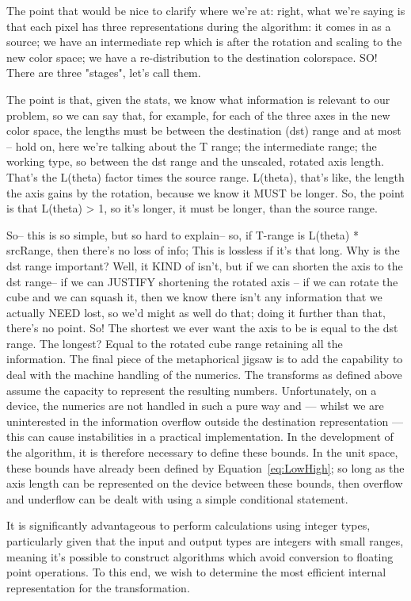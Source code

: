 The point that would be nice to clarify where we're at: right, what we're saying is that each pixel has three representations during the algorithm: it comes in as a source; we have an intermediate rep which is after the rotation and scaling to the new color space; we have a re-distribution to the destination colorspace. SO! There are three "stages", let's call them.

The point is that, given the stats, we know what information is relevant to our problem, so we can say that, for example, for each of the three axes in the new color space, the lengths must be between the destination (dst) range and at most -- hold on, here we're talking about the T range; the intermediate range; the working type, so between the dst range and the unscaled, rotated axis length. That's the L(theta) factor times the source range. L(theta), that's like, the length the axis gains by the rotation, because we know it MUST be longer.
So, the point is that L(theta) > 1, so it's longer, it must be longer, than the source range.

So-- this is so simple, but so hard to explain-- so, if T-range is L(theta) * srcRange, then there's no loss of info; This is lossless if it's that long. Why is the dst range important? Well, it KIND of isn't, but if we can shorten the axis to the dst range-- if we can JUSTIFY shortening the rotated axis -- if we can rotate the cube and we can squash it, then we know there isn't any information that we actually NEED lost, so we'd might as well do that; doing it further than that, there's no point. So! The shortest we ever want the axis to be is equal to the dst range. The longest? Equal to the rotated cube range retaining all the information.
The final piece of the metaphorical jigsaw is to add the capability to deal with the machine handling of the numerics. The transforms as defined above assume the capacity to represent the resulting numbers. Unfortunately, on a device, the numerics are not handled in such a pure way and --- whilst we are uninterested in the information overflow outside the destination representation --- this can cause instabilities in a practical implementation. In the development of the algorithm, it is therefore necessary to define these bounds. In the unit space, these bounds have already been defined by Equation~\ref{eq:LowHigh}; so long as the axis length can be represented on the device between these bounds, then overflow and underflow can be dealt with using a simple conditional statement.

It is significantly advantageous to perform calculations using integer types, particularly given that the input and output types are integers with small ranges, meaning it's possible to construct algorithms which avoid conversion to floating point operations. To this end, we wish to determine the most efficient internal representation for the transformation.

